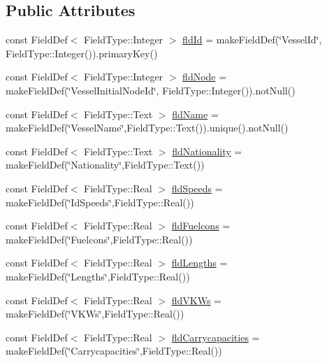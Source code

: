 \subsection*{Public Attributes}
\begin{DoxyCompactItemize}
\item 
const Field\+Def$<$ Field\+Type\+::\+Integer $>$ \mbox{\hyperlink{class_vessel_def_table_a4563302a8e9e40017c14b0298920fcf3}{fld\+Id}} = make\+Field\+Def(\char`\"{}Vessel\+Id\char`\"{}, Field\+Type\+::\+Integer()).primary\+Key()
\item 
const Field\+Def$<$ Field\+Type\+::\+Integer $>$ \mbox{\hyperlink{class_vessel_def_table_ad7f7871d2d5b43453915b68ae905a2d4}{fld\+Node}} = make\+Field\+Def(\char`\"{}Vessel\+Initial\+Node\+Id\char`\"{}, Field\+Type\+::\+Integer()).not\+Null()
\item 
const Field\+Def$<$ Field\+Type\+::\+Text $>$ \mbox{\hyperlink{class_vessel_def_table_a0a97ab7cbc9575cc30e20b4731bf3604}{fld\+Name}} = make\+Field\+Def(\char`\"{}Vessel\+Name\char`\"{},Field\+Type\+::\+Text()).unique().not\+Null()
\item 
const Field\+Def$<$ Field\+Type\+::\+Text $>$ \mbox{\hyperlink{class_vessel_def_table_a86ae9328894bba7a8d1720e636634433}{fld\+Nationality}} = make\+Field\+Def(\char`\"{}Nationality\char`\"{},Field\+Type\+::\+Text())
\item 
const Field\+Def$<$ Field\+Type\+::\+Real $>$ \mbox{\hyperlink{class_vessel_def_table_a34714bb93169ad9f570b1f8cb7a68b3d}{fld\+Speeds}} = make\+Field\+Def(\char`\"{}Id\+Speeds\char`\"{},Field\+Type\+::\+Real())
\item 
const Field\+Def$<$ Field\+Type\+::\+Real $>$ \mbox{\hyperlink{class_vessel_def_table_aa6dcc37cdc8bfd22f59e2e171705daa5}{fld\+Fuelcons}} = make\+Field\+Def(\char`\"{}Fuelcons\char`\"{},Field\+Type\+::\+Real())
\item 
const Field\+Def$<$ Field\+Type\+::\+Real $>$ \mbox{\hyperlink{class_vessel_def_table_af5536458974e15523e5c01fef0fb6d94}{fld\+Lengths}} = make\+Field\+Def(\char`\"{}Lengths\char`\"{},Field\+Type\+::\+Real())
\item 
const Field\+Def$<$ Field\+Type\+::\+Real $>$ \mbox{\hyperlink{class_vessel_def_table_a196a7ed569bb463dc08a442facfae121}{fld\+V\+K\+Ws}} = make\+Field\+Def(\char`\"{}V\+K\+Ws\char`\"{},Field\+Type\+::\+Real())
\item 
const Field\+Def$<$ Field\+Type\+::\+Real $>$ \mbox{\hyperlink{class_vessel_def_table_ac67fb77a644568c1a806ffbb8630c7c4}{fld\+Carrycapacities}} = make\+Field\+Def(\char`\"{}Carrycapacities\char`\"{},Field\+Type\+::\+Real())

\end{DoxyCompactItemize}
